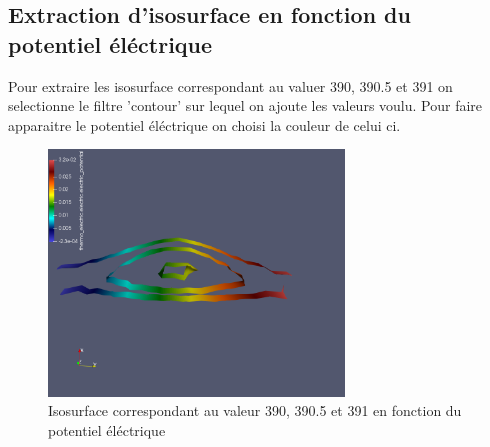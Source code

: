 \documentclass{article}
\begin{document}
\subsection{Extraction d'isosurface en fonction du potentiel éléctrique}
Pour extraire les isosurface correspondant au valuer 390, 390.5 et 391 on selectionne le filtre 'contour' sur lequel on ajoute les valeurs voulu.
Pour faire apparaitre le potentiel éléctrique on choisi la couleur de celui ci. 
\begin{figure}[h]
    \centering
    \includegraphics[width=0.7\textwidth]{images/isosurface.png}
    \caption{Isosurface correspondant au valeur 390, 390.5 et 391 en fonction du potentiel éléctrique}
\end{figure}
\end{document}
